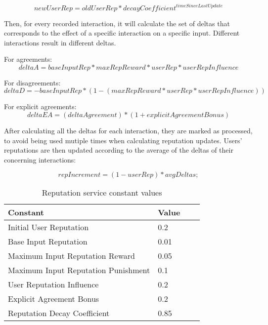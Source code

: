\begin{equation}
    newUserRep = oldUserRep * decayCoefficient^{timeSinceLastUpdate}
\end{equation}

Then, for every recorded interaction, it will calculate the set of deltas that corresponds to the effect of a specific interaction on a specific input. Different interactions result in different deltas.

For agreements:
\begin{equation}
    deltaA = baseInputRep * maxRepReward * userRep * userRepInfluence
\end{equation}

For disagreements:
\begin{equation}
    deltaD = -baseInputRep * (1 - (maxRepReward * userRep * userRepInfluence))
\end{equation}

For explicit agreements:
\begin{equation}
    deltaEA = (deltaAgreement) * (1 + explicitAgreementBonus)
\end{equation}

After calculating all the deltas for each interaction, they are marked as processed, to avoid being used mutiple times when calculating reputation updates. Users' reputations are then updated according to the average of the deltas of their concerning interactions:

\begin{equation}
    repIncrement = (1 - userRep) * avgDeltas;
\end{equation}

\begin{table}
    \centering
    \caption{Reputation service constant values}
    \begin{tabular}{|l|l|l|l|}
        \hline
        \textbf{Constant}                   & \textbf{Value} \\ \hline \hline
        Initial User Reputation             & 0.2 \\ \hline
        Base Input Reputation               & 0.01    \\ \hline
        Maximum Input Reputation Reward     & 0.05    \\ \hline
        Maximum Input Reputation Punishment & 0.1    \\ \hline
        User Reputation Influence           & 0.2    \\ \hline
        Explicit Agreement Bonus            & 0.2    \\ \hline
        Reputation Decay Coefficient        & 0.85    \\ \hline
    \end{tabular}
    \label{table:reputation-constants}
\end{table}


